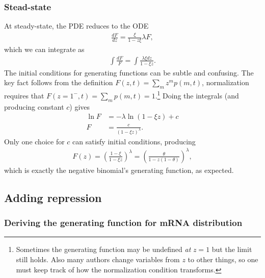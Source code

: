 \documentclass[12pt]{article}%
\newcommand{\deriv}[2][{}]{\frac{d #1}{d #2}}
\begin{document}
\subsubsection{Stead-state}
At steady-state, the PDE reduces to the ODE
\begin{align}
\deriv[F]{z} = \frac{\xi}{1-z\xi}\lambda F,
\end{align}
which we can integrate as
\begin{align}
\int \frac{dF}{F} = \int \frac{\lambda\xi dz}{1-\xi z}.
\end{align}
The initial conditions for generating functions can be subtle and confusing.
The key fact follows from the definition
$F(z,t) = \sum_m z^m p(m,t)$,
normalization requires that
$F(z=1^-,t) = \sum_m p(m,t) = 1$.\footnote{
Sometimes the generating function may be undefined \textit{at} $z=1$ but the
limit still holds. Also many authors change variables from $z$ to other
things, so one must keep track of how the normalization condition transforms.
}
Doing the integrals (and producing constant $c$) gives
\begin{align}
\ln F &= -\lambda \ln(1-\xi z) + c
\\
F &= \frac{c}{(1-\xi z)^\lambda}.
\end{align}
Only one choice for $c$ can satisfy initial conditions, producing
\begin{align}
F(z) = \left(\frac{1-\xi}{1-\xi z}\right)^\lambda
        = \left(\frac{\theta}{1 - z(1-\theta)}\right)^\lambda,
\end{align}
which is exactly the negative binomial's generating function, as expected.

\subsection{Adding repression}
\subsubsection{Deriving the generating function for mRNA distribution}
\end{document}
